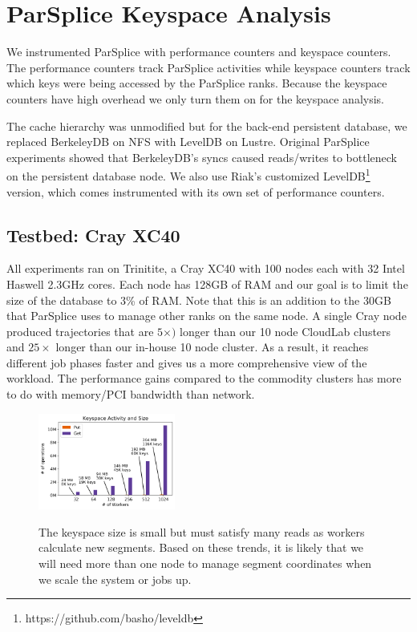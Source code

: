 \section{ParSplice Keyspace Analysis}
\label{sec:parsplice-keyspace-analysis}

We instrumented ParSplice with performance counters and keyspace counters.  The
performance counters track ParSplice activities while keyspace counters track
which keys were being accessed by the ParSplice ranks. Because the keyspace
counters have high overhead we only turn them on for the keyspace analysis.

The cache hierarchy was unmodified but for the back-end persistent database, we
replaced BerkeleyDB on NFS with LevelDB on Lustre. Original ParSplice
experiments showed that BerkeleyDB's syncs caused reads/writes to bottleneck on
the persistent database node. We also use Riak's customized
LevelDB\footnote{https://github.com/basho/leveldb} version, which comes
instrumented with its own set of performance counters.

\subsection*{Testbed: Cray XC40}

All experiments ran on Trinitite, a Cray XC40 with 100 nodes each with 32 Intel
Haswell 2.3GHz cores.  Each node has 128GB of RAM and our goal is to limit the
size of the database to 3\% of RAM. Note that this is an addition to the 30GB
that ParSplice uses to manage other ranks on the same node.  A single Cray node
produced trajectories that are \(5\times)\) longer than our 10 node CloudLab
clusters and \(25\times\) longer than our in-house 10 node cluster. As a
result, it reaches different job phases faster and gives us a more
comprehensive view of the workload. The performance gains compared to the
commodity clusters has more to do with memory/PCI bandwidth than network.

\begin{figure}[t]
  \noindent\includegraphics[width=0.4\textwidth]{figures/methodology-keyspace.png}\\
  \caption{The keyspace size is small but must satisfy many reads as workers
  calculate new segments. Based on these trends, it is likely that we will need
  more than one node to manage segment coordinates when we scale the system or jobs up.
  \label{fig:methodology-keyspace}}
\end{figure}

